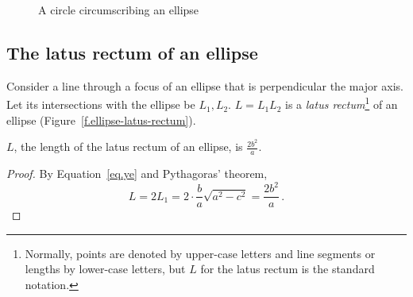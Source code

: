 \begin{figure}[tb]
\begin{center}
\caption{A circle circumscribing an ellipse}\label{f.ellipse-circle}
\end{center}
\end{figure}


\subsection{The latus rectum of an ellipse}

\begin{definition}\label{def.ellipse-lr}
Consider a line through a focus of an ellipse that is perpendicular the major axis. Let its intersections with the ellipse be $L_1,L_2$. $L=L_1L_2$ is a \emph{latus rectum}\footnote{Normally, points are denoted by upper-case letters and line segments or lengths by lower-case letters, but $L$ for the latus rectum is the standard notation.} of an ellipse (Figure~\ref{f.ellipse-latus-rectum}).
\end{definition}
\begin{theorem}\label{thm.ellipse-lr}
$L$, the length of the latus rectum of an ellipse, is 
$\displaystyle\frac{2b^2}{a}$.
\end{theorem}
\begin{proof}
By Equation~\ref{eq.ye} and Pythagoras' theorem,
\[
L=2L_1=2\cdot\frac{b}{a}\sqrt{a^2-c^2}=\displaystyle\frac{2b^2}{a}\,.
\]\hqed
\end{proof}

